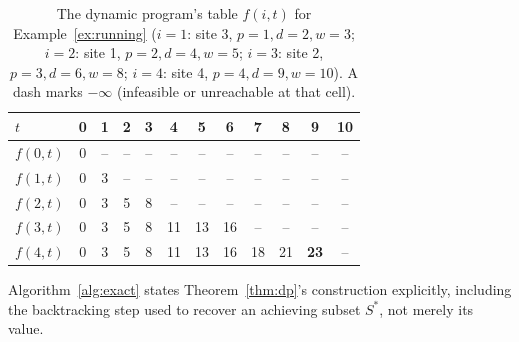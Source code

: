 \documentclass[pdflatex,sn-mathphys-ay]{sn-jnl}
\theoremstyle{thmstyleone}
\theoremstyle{thmstyletwo}
\theoremstyle{thmstylethree}
\begin{document}
\begin{table}[h]
\caption{The dynamic program's table $f(i,t)$ for
Example~\ref{ex:running} ($i=1$: site 3, $p=1,d=2,w=3$; $i=2$: site 1,
$p=2,d=4,w=5$; $i=3$: site 2, $p=3,d=6,w=8$; $i=4$: site 4, $p=4,d=9,
w=10$). A dash marks $-\infty$ (infeasible or unreachable at that
cell).}\label{tab:dpwalkthrough}
\begin{tabular}{@{}lccccccccccc@{}}
\toprule
$t$ & 0 & 1 & 2 & 3 & 4 & 5 & 6 & 7 & 8 & 9 & 10\\
\midrule
$f(0,t)$ & 0 & -- & -- & -- & -- & -- & -- & -- & -- & -- & --\\
$f(1,t)$ & 0 & 3 & -- & -- & -- & -- & -- & -- & -- & -- & --\\
$f(2,t)$ & 0 & 3 & 5 & 8 & -- & -- & -- & -- & -- & -- & --\\
$f(3,t)$ & 0 & 3 & 5 & 8 & 11 & 13 & 16 & -- & -- & -- & --\\
$f(4,t)$ & 0 & 3 & 5 & 8 & 11 & 13 & 16 & 18 & 21 & \textbf{23} & --\\
\bottomrule
\end{tabular}
\end{table}

Algorithm~\ref{alg:exact} states Theorem~\ref{thm:dp}'s construction
explicitly, including the backtracking step used to recover an
achieving subset $S^\ast$, not merely its value.
\end{document}
